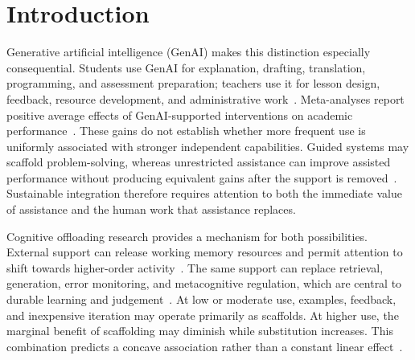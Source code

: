 \documentclass[sustainability,article,accept,moreauthors]{Definitions/mdpi}
\begin{document}

\section{Introduction}\label{sec:intro}


Generative artificial intelligence (GenAI) makes this distinction especially consequential. Students use GenAI for explanation, drafting, translation, programming, and assessment preparation; teachers use it for lesson design, feedback, resource development, and administrative work~\cite{chiu2024}. Meta-analyses report positive average effects of GenAI-supported interventions on academic performance~\cite{sunzhou2024,gu2025}. These gains do not establish whether more frequent use is uniformly associated with stronger independent capabilities. Guided systems may scaffold problem-solving, whereas unrestricted assistance can improve assisted performance without producing equivalent gains after the support is removed~\cite{bastani2025,fan2025}. Sustainable integration therefore requires attention to both the immediate value of assistance and the human work that assistance replaces.

Cognitive offloading research provides a mechanism for both possibilities. External support can release working memory resources and permit attention to shift towards higher-order activity~\cite{sweller2019}. The same support can replace retrieval, generation, error monitoring, and metacognitive regulation, which are central to durable learning and judgement~\cite{risko2016,bjork2011,sparrow2011}. At low or moderate use, examples, feedback, and inexpensive iteration may operate primarily as scaffolds. At higher use, the marginal benefit of scaffolding may diminish while substitution increases. This combination predicts a concave association rather than a constant linear effect~\cite{pierce2013,haans2016,zhao2025}.
\end{document}
